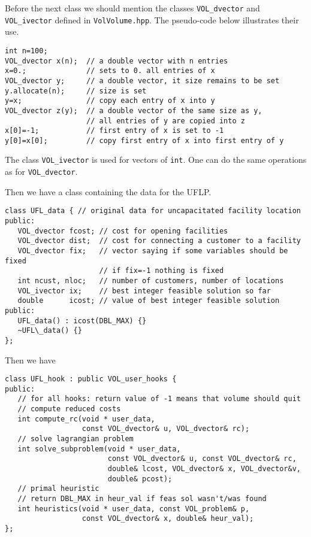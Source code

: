 \documentclass{article}
\begin{document}
Before the next class we should mention the classes {\tt VOL\_dvector} and
{\tt VOL\_ivector} defined in {\tt VolVolume.hpp}. The pseudo-code below
illustrates their use. 

\begin{verbatim}
int n=100; 
VOL_dvector x(n);  // a double vector with n entries 
x=0.;              // sets to 0. all entries of x 
VOL_dvector y;     // a double vector, it size remains to be set 
y.allocate(n);     // size is set
y=x;               // copy each entry of x into y 
VOL_dvector z(y);  // a double vector of the same size as y, 
                   // all entries of y are copied into z 
x[0]=-1;           // first entry of x is set to -1 
y[0]=x[0];         // copy first entry of x into first entry of y
\end{verbatim}

The class {\tt VOL\_ivector} is used for vectors of {\tt int}. One can do the
same operations as for {\tt VOL\_dvector}.

Then we have a class containing the data for the UFLP.

\begin{verbatim}
class UFL_data { // original data for uncapacitated facility location
public:
   VOL_dvector fcost; // cost for opening facilities
   VOL_dvector dist;  // cost for connecting a customer to a facility
   VOL_dvector fix;   // vector saying if some variables should be fixed
                      // if fix=-1 nothing is fixed
   int ncust, nloc;   // number of customers, number of locations
   VOL_ivector ix;    // best integer feasible solution so far
   double      icost; // value of best integer feasible solution 
public:
   UFL_data() : icost(DBL_MAX) {}
   ~UFL\_data() {}  
};
\end{verbatim}

Then we have

\begin{verbatim}
class UFL_hook : public VOL_user_hooks {
public:
   // for all hooks: return value of -1 means that volume should quit
   // compute reduced costs
   int compute_rc(void * user_data, 
                  const VOL_dvector& u, VOL_dvector& rc);
   // solve lagrangian problem
   int solve_subproblem(void * user_data, 
                        const VOL_dvector& u, const VOL_dvector& rc,
                        double& lcost, VOL_dvector& x, VOL_dvector&v,
                        double& pcost);
   // primal heuristic
   // return DBL_MAX in heur_val if feas sol wasn't/was found 
   int heuristics(void * user_data, const VOL_problem& p, 
                  const VOL_dvector& x, double& heur_val);
};
\end{verbatim}
\end{document}
